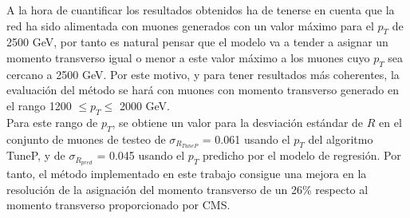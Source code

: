 A la hora de cuantificar los resultados obtenidos ha de tenerse en cuenta que la red ha sido alimentada con muones generados con un valor m\'aximo para el $p_{T}$ de 2500 GeV, por tanto es natural pensar que el modelo va a tender a asignar un momento transverso igual o menor a este valor m\'aximo a los muones cuyo $p_{T}$ sea cercano a 2500 GeV. Por este motivo, y para tener resultados m\'as coherentes, la evaluaci\'on del m\'etodo se har\'a con muones con momento transverso generado en el rango 1200 $\leq p_{T} \leq$ 2000 GeV. \\

Para este rango de $p_{T}$, se obtiene un valor para la desviaci\'on est\'andar de $R$ en el conjunto de muones de testeo de $\sigma_{R_{TuneP}}$ = 0.061 usando el $p_{T}$ del algoritmo TuneP, y de $\sigma_{R_{pred}}$ = 0.045 usando el $p_{T}$ predicho por el modelo de regresi\'on. Por tanto, el m\'etodo implementado en este trabajo consigue una mejora en la resoluci\'on de la asignaci\'on del momento transverso de un 26\% respecto al momento transverso proporcionado por CMS. \\

\clearpage
